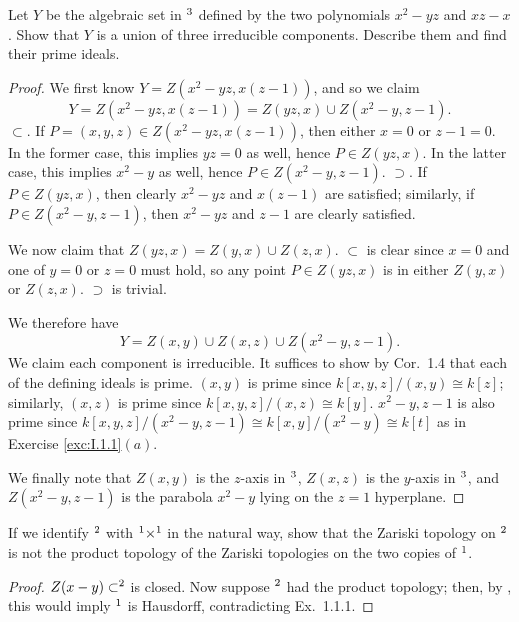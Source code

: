 \documentclass[10pt]{article}
\theoremstyle{definition}
\theoremstyle{remark}
\numberwithin{equation}{section}
\numberwithin{figure}{subsubsection}
\let\AA\relax
\DeclareMathOperator{\AA}{\mathbf{A}}
\begin{document}
\begin{problem}
  Let $Y$ be the algebraic set in $\AA^3$ defined by the two polynomials
  $x^2 - yz$ and $xz - x$.
  Show that $Y$ is a union of three irreducible components.
  Describe them and find their prime ideals.
\end{problem}
\begin{proof}
  We first know $Y = Z(x^2-yz,x(z-1))$, and so we claim
  \begin{equation*}
    Y = Z(x^2-yz,x(z-1)) = Z(yz,x) \cup Z(x^2-y,z-1).
  \end{equation*}
  $\subset$. If $P = (x,y,z) \in Z(x^2-yz,x(z-1))$, then either $x=0$ or
  $z-1=0$.
  In the former case, this implies $yz =0$ as well, hence $P \in Z(yz,x)$.
  In the latter case, this implies $x^2-y$ as well, hence $P \in Z(x^2-y,z-1)$.
  $\supset$. If $P \in Z(yz,x)$, then clearly $x^2-yz$ and $x(z-1)$ are
  satisfied; similarly, if $P \in Z(x^2-y,z-1)$, then $x^2-yz$ and $z-1$ are
  clearly satisfied.
  \par We now claim that $Z(yz,x) = Z(y,x) \cup Z(z,x)$. $\subset$ is clear
  since $x=0$ and one of $y = 0$ or $z=0$ must hold, so any point
  $P \in Z(yz,x)$ is in either $Z(y,x)$ or $Z(z,x)$.
  $\supset$ is trivial.
  \par We therefore have
  \begin{equation*}
    Y = Z(x,y) \cup Z(x,z) \cup Z(x^2-y,z-1).
  \end{equation*}
  We claim each component is irreducible.
  It suffices to show by Cor.~1.4 that each of the defining ideals is prime.
  $(x,y)$ is prime since $k[x,y,z]/(x,y) \cong k[z]$; similarly, $(x,z)$ is
  prime since $k[x,y,z]/(x,z) \cong k[y]$.
  $x^2-y,z-1$ is also prime since
  $k[x,y,z]/(x^2-y,z-1) \cong k[x,y]/(x^2-y) \cong k[t]$ as in Exercise
  \ref{exc:I.1.1}$(a)$.
  \par We finally note that $Z(x,y)$ is the $z$-axis in $\AA^3$, $Z(x,z)$ is
  the $y$-axis in $\AA^3$, and $Z(x^2-y,z-1)$ is the parabola $x^2-y$ lying on
  the $z=1$ hyperplane.
\end{proof}

\begin{problem}
  If we identify $\AA^2$ with $\AA^1 \times \AA^1$ in the natural way, show
  that the Zariski topology on $\AA^2$ is not the product topology of the
  Zariski topologies on the two copies of $\AA^1$.
\end{problem}
\begin{proof}
  $Z(x-y) \subset \AA^2$ is closed. Now suppose $\AA^2$ had the product
  topology; then, by \cite[Exc.~17.13]{Mun00}, this would imply $\AA^1$ is
  Hausdorff, contradicting Ex.~1.1.1.
\end{proof}
\end{document}
